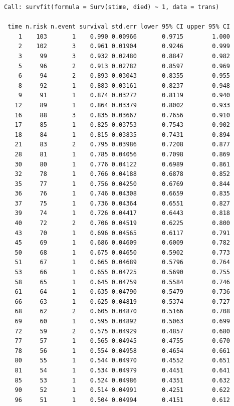 \documentclass[
  12pt,
  letterpaper,
  DIV=11,
  numbers=noendperiod,
  onepage,
  openany]{scrreprt}
\begin{document}
\begin{verbatim}
Call: survfit(formula = Surv(stime, died) ~ 1, data = trans)

 time n.risk n.event survival std.err lower 95% CI upper 95% CI
    1    103       1    0.990 0.00966       0.9715        1.000
    2    102       3    0.961 0.01904       0.9246        0.999
    3     99       3    0.932 0.02480       0.8847        0.982
    5     96       2    0.913 0.02782       0.8597        0.969
    6     94       2    0.893 0.03043       0.8355        0.955
    8     92       1    0.883 0.03161       0.8237        0.948
    9     91       1    0.874 0.03272       0.8119        0.940
   12     89       1    0.864 0.03379       0.8002        0.933
   16     88       3    0.835 0.03667       0.7656        0.910
   17     85       1    0.825 0.03753       0.7543        0.902
   18     84       1    0.815 0.03835       0.7431        0.894
   21     83       2    0.795 0.03986       0.7208        0.877
   28     81       1    0.785 0.04056       0.7098        0.869
   30     80       1    0.776 0.04122       0.6989        0.861
   32     78       1    0.766 0.04188       0.6878        0.852
   35     77       1    0.756 0.04250       0.6769        0.844
   36     76       1    0.746 0.04308       0.6659        0.835
   37     75       1    0.736 0.04364       0.6551        0.827
   39     74       1    0.726 0.04417       0.6443        0.818
   40     72       2    0.706 0.04519       0.6225        0.800
   43     70       1    0.696 0.04565       0.6117        0.791
   45     69       1    0.686 0.04609       0.6009        0.782
   50     68       1    0.675 0.04650       0.5902        0.773
   51     67       1    0.665 0.04689       0.5796        0.764
   53     66       1    0.655 0.04725       0.5690        0.755
   58     65       1    0.645 0.04759       0.5584        0.746
   61     64       1    0.635 0.04790       0.5479        0.736
   66     63       1    0.625 0.04819       0.5374        0.727
   68     62       2    0.605 0.04870       0.5166        0.708
   69     60       1    0.595 0.04892       0.5063        0.699
   72     59       2    0.575 0.04929       0.4857        0.680
   77     57       1    0.565 0.04945       0.4755        0.670
   78     56       1    0.554 0.04958       0.4654        0.661
   80     55       1    0.544 0.04970       0.4552        0.651
   81     54       1    0.534 0.04979       0.4451        0.641
   85     53       1    0.524 0.04986       0.4351        0.632
   90     52       1    0.514 0.04991       0.4251        0.622
   96     51       1    0.504 0.04994       0.4151        0.612

\end{verbatim}
\end{document}
